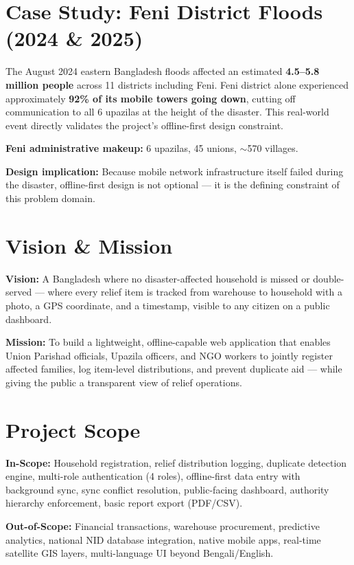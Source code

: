 \section{Case Study: Feni District Floods (2024 \& 2025)}
The August 2024 eastern Bangladesh floods affected an estimated \textbf{4.5--5.8 million people} across 11 districts including Feni. Feni district alone experienced approximately \textbf{92\% of its mobile towers going down}, cutting off communication to all 6 upazilas at the height of the disaster. This real-world event directly validates the project's offline-first design constraint.

\textbf{Feni administrative makeup:} 6 upazilas, 45 unions, $\sim$570 villages.

\textbf{Design implication:} Because mobile network infrastructure itself failed during the disaster, offline-first design is not optional --- it is the defining constraint of this problem domain.
\vspace{-4pt}
\section{Vision \& Mission}
\textbf{Vision:} A Bangladesh where no disaster-affected household is missed or double-served --- where every relief item is tracked from warehouse to household with a photo, a GPS coordinate, and a timestamp, visible to any citizen on a public dashboard.

\textbf{Mission:} To build a lightweight, offline-capable web application that enables Union Parishad officials, Upazila officers, and NGO workers to jointly register affected families, log item-level distributions, and prevent duplicate aid --- while giving the public a transparent view of relief operations.

\section{Project Scope}
\textbf{In-Scope:} Household registration, relief distribution logging, duplicate detection engine, multi-role authentication (4 roles), offline-first data entry with background sync, sync conflict resolution, public-facing dashboard, authority hierarchy enforcement, basic report export (PDF/CSV).

\textbf{Out-of-Scope:} Financial transactions, warehouse procurement, predictive analytics, national NID database integration, native mobile apps, real-time satellite GIS layers, multi-language UI beyond Bengali/English.

